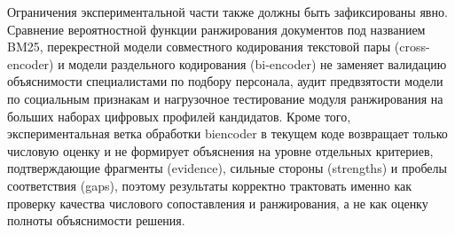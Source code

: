 Ограничения экспериментальной части также должны быть зафиксированы явно. Сравнение вероятностной функции ранжирования документов под названием BM25, перекрестной модели совместного кодирования текстовой пары (cross-encoder) и модели раздельного кодирования (bi-encoder) не заменяет валидацию объяснимости специалистами по подбору персонала, аудит предвзятости модели по социальным признакам и нагрузочное тестирование модуля ранжирования на больших наборах цифровых профилей кандидатов. Кроме того, экспериментальная ветка обработки biencoder в текущем коде возвращает только числовую оценку и не формирует объяснения на уровне отдельных критериев, подтверждающие фрагменты (evidence), сильные стороны (strengths) и пробелы соответствия (gaps), поэтому результаты корректно трактовать именно как проверку качества числового сопоставления и ранжирования, а не как оценку полноты объяснимости решения.\par
